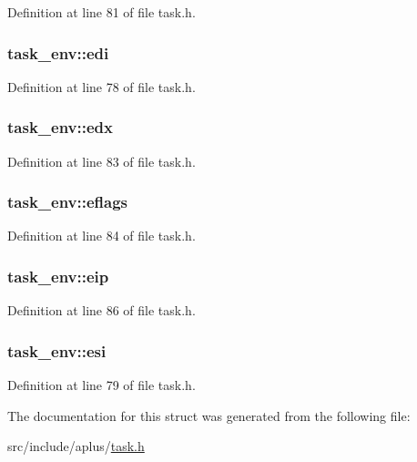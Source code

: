Definition at line 81 of file task.\+h.

\hypertarget{structtask__env_afd28f73e49aab123e4c2a5f149f10fe2}{
\subsubsection[{edi}]{ task\+\_\+env\+::edi}}\label{structtask__env_afd28f73e49aab123e4c2a5f149f10fe2}


Definition at line 78 of file task.\+h.

\hypertarget{structtask__env_ab76a643115c795f2f9feb5582ea29497}{
\subsubsection[{edx}]{ task\+\_\+env\+::edx}}\label{structtask__env_ab76a643115c795f2f9feb5582ea29497}


Definition at line 83 of file task.\+h.

\hypertarget{structtask__env_a1eeaac73d44a6550af32a9dd726935e5}{
\subsubsection[{eflags}]{ task\+\_\+env\+::eflags}}\label{structtask__env_a1eeaac73d44a6550af32a9dd726935e5}


Definition at line 84 of file task.\+h.

\hypertarget{structtask__env_ae6f3defc8a0fe9512785fdfd2eedd07d}{
\subsubsection[{eip}]{ task\+\_\+env\+::eip}}\label{structtask__env_ae6f3defc8a0fe9512785fdfd2eedd07d}


Definition at line 86 of file task.\+h.

\hypertarget{structtask__env_a4bae98183ee224f67097a00d887a229b}{
\subsubsection[{esi}]{ task\+\_\+env\+::esi}}\label{structtask__env_a4bae98183ee224f67097a00d887a229b}


Definition at line 79 of file task.\+h.



The documentation for this struct was generated from the following file\+:\begin{DoxyCompactItemize}
\item 
src/include/aplus/\hyperlink{task_8h}{task.\+h}\end{DoxyCompactItemize}

